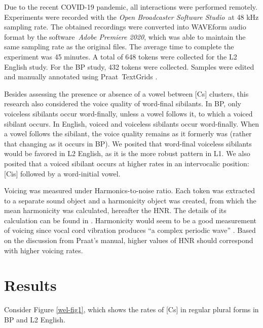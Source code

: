Due to the recent COVID-19 pandemic, all interactions were performed
remotely. Experiments were recorded with the \emph{Open Broadcaster
Software Studio}~at 48 kHz sampling rate. The obtained recordings were
converted into WAVEform audio format by the software~\emph{Adobe
Premiere 2020}, which was able to maintain the same sampling rate as the
original files. The average time to complete the experiment was 45 minutes. 
A total of 648 tokens were collected for the L2 English study.
For the BP study, 432 tokens were collected. Samples were edited and
manually annotated using Praat~TextGrids \citep{boersma2020}.

Besides assessing the presence or absence of a vowel between {[}Cs{]}
clusters, this research also considered the voice quality of word-final
sibilants. In BP, only voiceless sibilants occur word-finally, unless a
vowel follows it, to which a voiced sibilant occurs. In English, voiced
and voiceless sibilants occur word-finally. When a vowel follows the
sibilant, the voice quality remains as it formerly was (rather that
changing as it occurs in BP). We posited that word-final voiceless
sibilants would be favored in L2 English, as it is the more robust
pattern in L1. We also posited that a voiced sibilant occurs at higher
rates in an intervocalic position: {[}Cis{]} followed by a word-initial
vowel.

Voicing was measured under Harmonics-to-noise ratio. Each token was
extracted to a separate sound object and a harmonicity object was
created, from which the mean harmonicity was calculated, hereafter the
HNR. The details of its calculation can be found in \citet{Boersma93}.
Harmonicity would seem to be a good measurement of voicing since vocal
cord vibration produces ``a complex periodic wave'' \citep[p.~63]{johnson1997}. 
Based on the discussion from Praat's manual, higher values of HNR
should correspond with higher voicing rates.



\section{Results}

Consider Figure \ref{wel-fig1}, which shows the rates of {[}Cs{]} in regular plural
forms in BP and L2 English.

